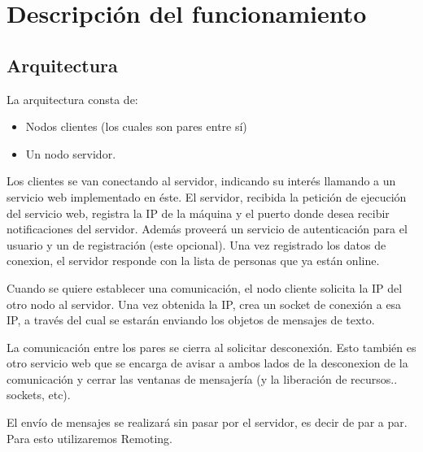 \section{Descripción del funcionamiento}


\subsection{Arquitectura}

La arquitectura consta de:

\begin{itemize}
  \item Nodos clientes (los cuales son pares entre sí)
  \item Un nodo servidor.
\end{itemize}

Los clientes se van conectando al servidor, indicando su interés llamando a un
servicio web implementado en éste. El servidor, recibida la petición de
ejecución del servicio web, registra la IP de la máquina y el puerto donde
desea recibir notificaciones del servidor. Además proveerá un servicio de
autenticación para el usuario y un de registración (este opcional). Una vez
registrado los datos de conexion, el servidor responde con la lista de personas
que ya están online.

Cuando se quiere establecer una comunicación, el nodo cliente solicita la IP
del otro nodo al servidor. Una vez obtenida la IP, crea un socket de conexión a
esa IP, a través del cual se estarán enviando los objetos de mensajes de texto.

La comunicación entre los pares se cierra al solicitar desconexión. Esto
también es otro servicio web que se encarga de avisar a ambos lados de la
desconexion de la comunicación y cerrar las ventanas de mensajería (y la
liberación de recursos.. sockets, etc).

El envío de mensajes se realizará sin pasar por el servidor, es decir de par a
par. Para esto utilizaremos Remoting.

